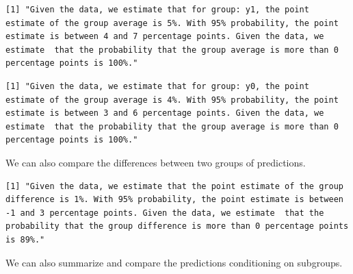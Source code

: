 \documentclass[
  letterpaper,
  DIV=11,
  numbers=noendperiod]{scrreprt}
\newenvironment{Shaded}{\begin{snugshade}}{\end{snugshade}}
\newcommand{\AttributeTok}[1]{\textcolor[rgb]{0.40,0.45,0.13}{#1}}
\newcommand{\DecValTok}[1]{\textcolor[rgb]{0.68,0.00,0.00}{#1}}
\newcommand{\FloatTok}[1]{\textcolor[rgb]{0.68,0.00,0.00}{#1}}
\newcommand{\FunctionTok}[1]{\textcolor[rgb]{0.28,0.35,0.67}{#1}}
\newcommand{\NormalTok}[1]{\textcolor[rgb]{0.00,0.23,0.31}{#1}}
\newcommand{\SpecialCharTok}[1]{\textcolor[rgb]{0.37,0.37,0.37}{#1}}
\newcommand{\StringTok}[1]{\textcolor[rgb]{0.13,0.47,0.30}{#1}}
\begin{document}
\begin{verbatim}
[1] "Given the data, we estimate that for group: y1, the point estimate of the group average is 5%. With 95% probability, the point estimate is between 4 and 7 percentage points. Given the data, we estimate  that the probability that the group average is more than 0 percentage points is 100%."
\end{verbatim}

\begin{Shaded}
\end{Shaded}

\begin{verbatim}
[1] "Given the data, we estimate that for group: y0, the point estimate of the group average is 4%. With 95% probability, the point estimate is between 3 and 6 percentage points. Given the data, we estimate  that the probability that the group average is more than 0 percentage points is 100%."
\end{verbatim}

We can also compare the differences between two groups of predictions.

\begin{Shaded}
\end{Shaded}

\begin{verbatim}
[1] "Given the data, we estimate that the point estimate of the group difference is 1%. With 95% probability, the point estimate is between -1 and 3 percentage points. Given the data, we estimate  that the probability that the group difference is more than 0 percentage points is 89%."
\end{verbatim}

We can also summarize and compare the predictions conditioning on
subgroups.
\end{document}
